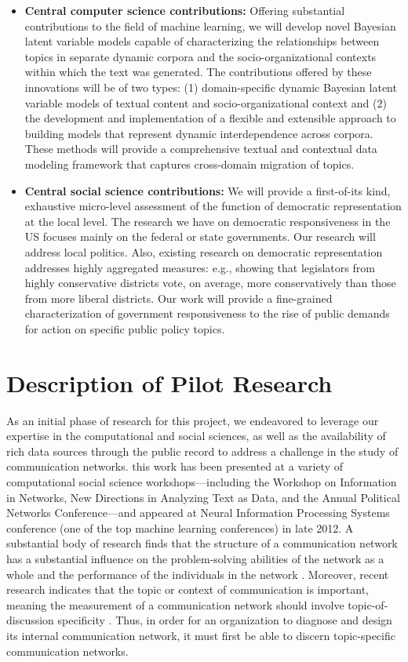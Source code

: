 \begin{itemize}
\item {\bf Central computer science contributions:} Offering substantial contributions to the field of machine learning, we will develop novel Bayesian latent variable models capable of characterizing the relationships between topics in separate dynamic corpora and the socio-organizational contexts within which the text was generated. The contributions offered by these innovations will be of two types: (1) domain-specific dynamic Bayesian latent variable models of textual content and socio-organizational context and (2) the development and implementation of a flexible and extensible approach to building models that represent dynamic interdependence across corpora. These methods will provide a comprehensive textual and contextual data modeling framework that captures cross-domain migration of topics. 
\item {\bf Central social science contributions:} We will provide a first-of-its kind, exhaustive micro-level assessment of the function of  democratic representation at the local level. The research we have on democratic responsiveness in the US focuses mainly on the federal or state governments. Our research will address local politics. Also, existing research on democratic representation addresses highly aggregated measures: e.g., showing that legislators from highly conservative districts vote, on average, more conservatively than those from more liberal districts. Our work will provide a fine-grained characterization of government responsiveness to the rise of public demands for action on specific public policy topics.
\end{itemize}



\section{Description of Pilot Research}

As an initial phase of research for this project, we endeavored to leverage our expertise in the computational and social sciences, as well as the availability of rich data sources through the public record to address a challenge in the study of communication networks. this work has been presented at
a variety of computational social science workshops---including the Workshop on Information in Networks, New Directions in Analyzing Text as Data, and the Annual Political Networks Conference---and appeared at Neural Information Processing Systems conference (one of the top machine learning conferences) in late 2012. A substantial body of research finds that the structure of a communication network has a substantial influence on the problem-solving abilities of the network as a whole and the performance of the individuals in the network \cite{Mason2012}. Moreover, recent research indicates that the topic or context of communication is important, meaning the measurement of a communication network should involve topic-of-discussion specificity \cite{Mason2008}. Thus, in order for an organization to diagnose and design its internal communication network, it must first be able to discern topic-specific communication networks.

